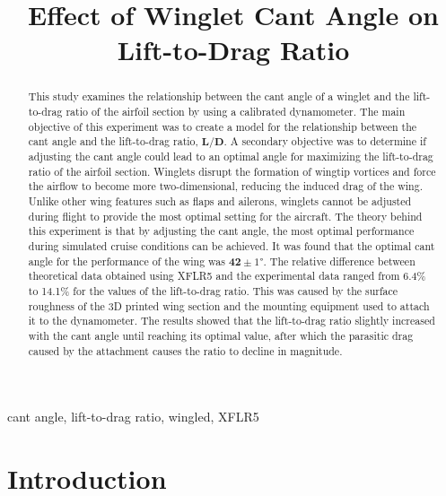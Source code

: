 \documentclass[journal,letterpaper]{IEEEtran}
\begin{document}
\title{Effect of Winglet Cant Angle on Lift-to-Drag Ratio}

\author{
}

\maketitle
\thispagestyle{empty}

\begin{abstract}
This study examines the relationship between the cant angle of a winglet and the lift-to-drag ratio of the airfoil section by using a calibrated dynamometer.
The main objective of this experiment was to create a model for the relationship between the cant angle and the lift-to-drag ratio, $\bm{L/D}$.
A secondary objective was to determine if adjusting the cant angle could lead to an optimal angle for maximizing the lift-to-drag ratio of the airfoil section.
Winglets disrupt the formation of wingtip vortices and force the airflow to become more two-dimensional, reducing the induced drag of the wing.
Unlike other wing features such as flaps and ailerons, winglets cannot be adjusted during flight to provide the most optimal setting for the aircraft.
The theory behind this experiment is that by adjusting the cant angle, the most optimal performance during simulated cruise conditions can be achieved.
It was found that the optimal cant angle for the performance of the wing was $\bm{42 \pm }\ang{1}$.
The relative difference between theoretical data obtained using XFLR5 and the experimental data ranged from 6.4\% to 14.1\% for the values of the lift-to-drag ratio.
This was caused by the surface roughness of the 3D printed wing section and the mounting equipment used to attach it to the dynamometer.
The results showed that the lift-to-drag ratio slightly increased with the cant angle until reaching its optimal value, after which the parasitic drag caused by the attachment causes the ratio to decline in magnitude.
\end{abstract}

\begin{IEEEkeywords}
cant angle, lift-to-drag ratio, wingled, XFLR5
\end{IEEEkeywords}


\section{Introduction}
\end{document}
